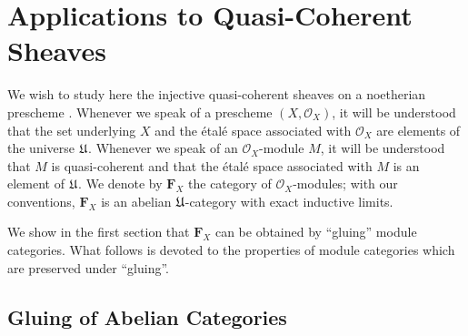 %
%
%
\providecommand{\gluecat}[3]{#1 \underset{#2}{\Vert} #3}

\chapter{Applications to Quasi-Coherent Sheaves}

We wish to study here the injective quasi-coherent sheaves on a
noetherian prescheme \textup{\cite{grothendieck-dieudonne}}. Whenever we
speak of a prescheme $(X, \mathcal{O}_X)$, it will be understood that the
set underlying $X$ and the étalé space associated with
$\mathcal{O}_X$ are elements of the universe $\mathfrak{U}$. Whenever we speak
of an $\mathcal{O}_X$-module $M$, it will be understood that $M$ is
quasi-coherent and that the étalé space associated with $M$ is an
element of $\mathfrak{U}$. We denote by $\mathbf{F}_X$ the category of
$\mathcal{O}_X$-modules; with our conventions, $\mathbf{F}_X$ is an
abelian $\mathfrak{U}$-category with exact inductive limits.

We show in the first section that $\mathbf{F}_X$ can be obtained by
``gluing'' module categories. What follows is devoted to the properties
of module categories which are preserved under ``gluing''.

\section{Gluing of Abelian Categories}

